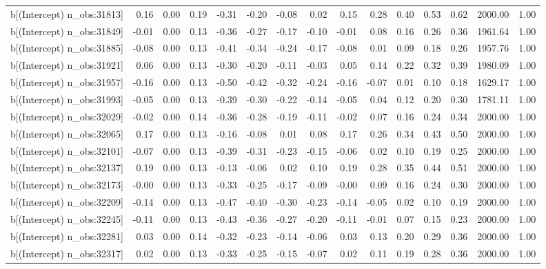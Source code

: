 \begin{table}[ht]
\begin{tabular}{rrrrrrrrrrrrrrr}
  b[(Intercept) n\_obs:31813] & 0.16 & 0.00 & 0.19 & -0.31 & -0.20 & -0.08 & 0.02 & 0.15 & 0.28 & 0.40 & 0.53 & 0.62 & 2000.00 & 1.00 \\ 
  b[(Intercept) n\_obs:31849] & -0.01 & 0.00 & 0.13 & -0.36 & -0.27 & -0.17 & -0.10 & -0.01 & 0.08 & 0.16 & 0.26 & 0.36 & 1961.64 & 1.00 \\ 
  b[(Intercept) n\_obs:31885] & -0.08 & 0.00 & 0.13 & -0.41 & -0.34 & -0.24 & -0.17 & -0.08 & 0.01 & 0.09 & 0.18 & 0.26 & 1957.76 & 1.00 \\ 
  b[(Intercept) n\_obs:31921] & 0.06 & 0.00 & 0.13 & -0.30 & -0.20 & -0.11 & -0.03 & 0.05 & 0.14 & 0.22 & 0.32 & 0.39 & 1980.09 & 1.00 \\ 
  b[(Intercept) n\_obs:31957] & -0.16 & 0.00 & 0.13 & -0.50 & -0.42 & -0.32 & -0.24 & -0.16 & -0.07 & 0.01 & 0.10 & 0.18 & 1629.17 & 1.00 \\ 
  b[(Intercept) n\_obs:31993] & -0.05 & 0.00 & 0.13 & -0.39 & -0.30 & -0.22 & -0.14 & -0.05 & 0.04 & 0.12 & 0.20 & 0.30 & 1781.11 & 1.00 \\ 
  b[(Intercept) n\_obs:32029] & -0.02 & 0.00 & 0.14 & -0.36 & -0.28 & -0.19 & -0.11 & -0.02 & 0.07 & 0.16 & 0.24 & 0.34 & 2000.00 & 1.00 \\ 
  b[(Intercept) n\_obs:32065] & 0.17 & 0.00 & 0.13 & -0.16 & -0.08 & 0.01 & 0.08 & 0.17 & 0.26 & 0.34 & 0.43 & 0.50 & 2000.00 & 1.00 \\ 
  b[(Intercept) n\_obs:32101] & -0.07 & 0.00 & 0.13 & -0.39 & -0.31 & -0.23 & -0.15 & -0.06 & 0.02 & 0.10 & 0.19 & 0.25 & 2000.00 & 1.00 \\ 
  b[(Intercept) n\_obs:32137] & 0.19 & 0.00 & 0.13 & -0.13 & -0.06 & 0.02 & 0.10 & 0.19 & 0.28 & 0.35 & 0.44 & 0.51 & 2000.00 & 1.00 \\ 
  b[(Intercept) n\_obs:32173] & -0.00 & 0.00 & 0.13 & -0.33 & -0.25 & -0.17 & -0.09 & -0.00 & 0.09 & 0.16 & 0.24 & 0.30 & 2000.00 & 1.00 \\ 
  b[(Intercept) n\_obs:32209] & -0.14 & 0.00 & 0.13 & -0.47 & -0.40 & -0.30 & -0.23 & -0.14 & -0.05 & 0.02 & 0.10 & 0.19 & 2000.00 & 1.00 \\ 
  b[(Intercept) n\_obs:32245] & -0.11 & 0.00 & 0.13 & -0.43 & -0.36 & -0.27 & -0.20 & -0.11 & -0.01 & 0.07 & 0.15 & 0.23 & 2000.00 & 1.00 \\ 
  b[(Intercept) n\_obs:32281] & 0.03 & 0.00 & 0.14 & -0.32 & -0.23 & -0.14 & -0.06 & 0.03 & 0.13 & 0.20 & 0.29 & 0.36 & 2000.00 & 1.00 \\ 
  b[(Intercept) n\_obs:32317] & 0.02 & 0.00 & 0.13 & -0.33 & -0.25 & -0.15 & -0.07 & 0.02 & 0.11 & 0.19 & 0.28 & 0.36 & 2000.00 & 1.00 \\ 

\end{tabular}
\end{table}
